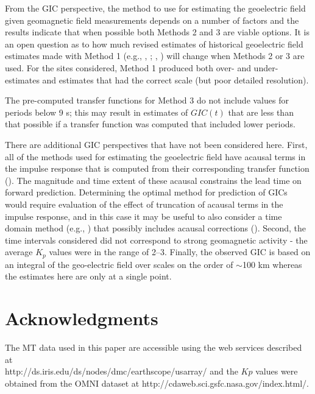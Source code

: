 \documentclass[12pt]{article}
\newcommand{\citeay}[1]{%
\citeauthor{#1}, \citeyear{#1}%
}
\begin{document}

From the GIC perspective, the method to use for estimating the geoelectric field given geomagnetic field measurements depends on a number of factors and the results indicate that when possible both Methods 2 and 3 are viable options.  It is an open question as to how much revised estimates of historical geoelectric field estimates made with Method 1 (e.g., \citeay{Pulkkinen2012}; \citeay{Wei2013}) will change when Methods 2 or 3 are used.  For the sites considered, Method 1 produced both over- and under-estimates and estimates that had the correct scale (but poor detailed resolution).

The pre-computed transfer functions for Method 3 do not include values for periods below 9 s; this may result in estimates of $GIC(t)$ that are less than that possible if a transfer function was computed that included lower periods. 

There are additional GIC perspectives that have not been considered here.  First, all of the methods used for estimating the geoelectric field have acausal terms in the impulse response that is computed from their corresponding transfer function (\cite{Egbert1992}).  The magnitude and time extent of these acausal constrains the lead time on forward prediction.  Determining the optimal method for prediction of GICs would require evaluation of the effect of truncation of acausal terms in the impulse response, and in this case it may be useful to also consider a time domain method (e.g., \cite{McMechan1985}) that possibly includes acausal corrections (\cite{Tzschoppe2009}).  Second, the time intervals considered did not correspond to strong geomagnetic activity - the average $K_p$ values were in the range of 2--3.  Finally, the observed GIC is based on an integral of the geo-electric field over scales on the order of $\sim$100 km whereas the estimates here are only at a single point.

\section{Acknowledgments}

The MT data used in this paper are accessible using the web services described at \\http://ds.iris.edu/ds/nodes/dmc/earthscope/usarray/ and the $Kp$ values were obtained from the OMNI dataset at http://cdaweb.sci.gsfc.nasa.gov/index.html/.
\end{document}
